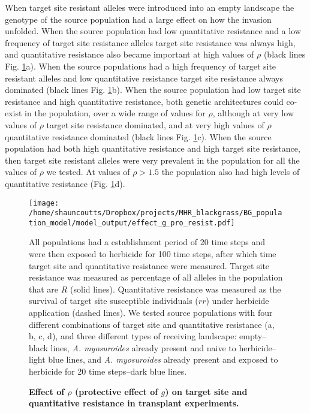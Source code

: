 \documentclass[10pt,letterpaper]{article}
\begin{document}
When target site resistant alleles were introduced into an empty landscape the genotype of the source population had a large effect on how the invasion unfolded. When the source population had low quantitative resistance and a low frequency of target site resistance alleles target site resistance was always high, and quantitative resistance also became important at high values of $\rho$ (black lines Fig. \ref{fig:transloc_gpro}a). When the source populations had a high frequency of target site resistant alleles and low quantitative resistance target site resistance always dominated (black lines Fig. \ref{fig:transloc_gpro}b). When the source population had low target site resistance and high quantitative resistance, both genetic architectures could co-exist in the population, over a wide range of values for $\rho$, although at very low values of $\rho$ target site resistance dominated, and at very high values of $\rho$ quantitative resistance dominated (black lines Fig. \ref{fig:transloc_gpro}c). When the source population had both high quantitative resistance and high target site resistance, then target site resistant alleles were very prevalent in the population for all the values of $\rho$ we tested. At values of $\rho > 1.5$ the population also had high levels of quantitative resistance (Fig. \ref{fig:transloc_gpro}d).                      

\begin{figure}[!h] 
	\texttt{[image: /home/shauncoutts/Dropbox/projects/MHR\_blackgrass/BG\_population\_model/model\_output/effect\_g\_pro\_resist.pdf]}
\caption{\bf Effect of $\rho$ (protective effect of $g$) on target site and quantitative resistance in transplant experiments.} All populations had a establishment period of 20 time steps and were then exposed to herbicide for 100 time steps, after which time target site and quantitative resistance were measured. Target site resistance was measured as percentage of all alleles in the population that are $R$ (solid lines). Quantitative resistance was measured as the survival of target site susceptible individuals ($rr$) under herbicide application (dashed lines). We tested source populations with four different combinations of target site and quantitative resistance (a, b, c, d), and three different types of receiving landscape: empty--black lines, \textit{A. myosuroides} already present and naive to herbicide--light blue lines, and \textit{A. myosuroides} already present and exposed to herbicide for 20 time steps--dark blue lines.        
\label{fig:transloc_gpro}
\end{figure}
\end{document}
